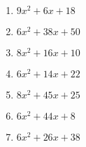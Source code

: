 \documentclass[9pt,dvipdfmx,a4paper]{article}
\begin{document}
\begin{multicols}{2}
\begin{enumerate}
\item
$ 9 x^{2} + 6 x + 18$

\item
$ 6 x^{2} + 38 x + 50$

\item
$ 8 x^{2} + 16 x + 10$

\item
$ 6 x^{2} + 14 x + 22$

\item
$ 8 x^{2} + 45 x + 25$

\item
$ 6 x^{2} + 44 x + 8$

\item
$ 6 x^{2} + 26 x + 38$


\end{enumerate}
\end{multicols}
\end{document}

